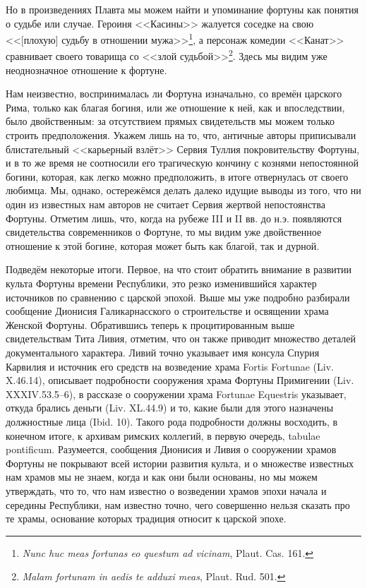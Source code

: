 Но в произведениях Плавта мы можем найти и упоминание фортуны как понятия о судьбе или случае. Героиня <<Касины>> жалуется соседке на свою <<[плохую] судьбу в отношении мужа>>\footnote{\textit{Nunc huc meas fortunas eo questum ad vicinam}, Plaut. Cas. 161.}, а персонаж комедии <<Канат>> сравнивает своего товарища со <<злой судьбой>>\footnote{\textit{Malam fortunam in aedis te adduxi meas}, Plaut. Rud. 501.}. Здесь мы видим уже неоднозначное отношение к фортуне.

Нам неизвестно, воспринималась ли Фортуна изначально, со времён царского Рима, только как благая богиня, или же отношение к ней, как и впоследствии, было двойственным: за отсутствием прямых свидетельств мы можем только строить предположения. Укажем лишь на то, что, античные авторы приписывали блистательный <<карьерный взлёт>> Сервия Туллия покровительству Фортуны, и в то же время не соотносили его трагическую кончину с кознями непостоянной богини, которая, как легко можно предположить, в итоге отвернулась от своего любимца. Мы, однако, остережёмся делать далеко идущие выводы из того, что ни один из известных нам авторов не считает Сервия жертвой непостоянства Фортуны. Отметим лишь, что, когда на рубеже III и II вв. до н.э. появляются свидетельства современников о Фортуне, то мы видим уже двойственное отношение к этой богине, которая может быть как благой, так и дурной.

Подведём некоторые итоги. Первое, на что стоит обратить внимание в развитии культа Фортуны времени Республики, это резко изменившийся характер источников по сравнению с царской эпохой. Выше мы уже подробно разбирали сообщение Дионисия Галикарнасского о строительстве и освящении храма Женской Фортуны. Обратившись теперь к процитированным выше свидетельствам Тита Ливия, отметим, что он также приводит множество деталей документального характера. Ливий точно указывает имя консула Спурия Карвилия и источник его средств на возведение храма Fortis Fortunae (Liv. X.46.14), описывает подробности сооружения храма Фортуны Примигении (Liv. XXXIV.53.5--6), в рассказе о сооружении храма Fortunae Equestris указывает, откуда брались деньги (Liv. XL.44.9) и то, какие были для этого назначены должностные лица (Ibid. 10). Такого рода подробности должны восходить, в конечном итоге, к архивам римских коллегий, в первую очередь, tabulae pontificum. Разумеется, сообщения Дионисия и Ливия о сооружении храмов Фортуны не покрывают всей истории развития культа, и о множестве известных нам храмов мы не знаем, когда и как они были основаны, но мы можем утверждать, что то, что нам известно о возведении храмов эпохи начала и середины Республики, нам известно точно, чего совершенно нельзя сказать про те храмы, основание которых традиция относит к царской эпохе.

